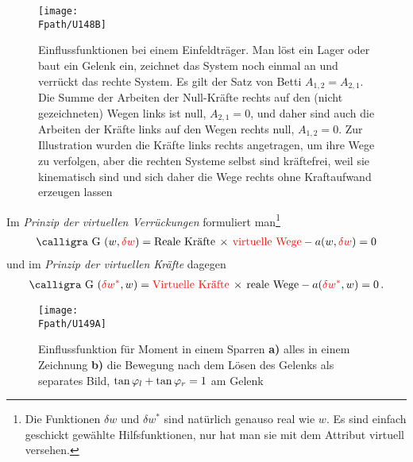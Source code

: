 {{{{%
\begin{figure}[tbp]
\centering
\if {} \sidecaption \fi
\texttt{[image: \\Fpath/U148B]}
\caption{Einflussfunktionen bei einem Einfeldtr\"{a}ger. Man l\"{o}st ein Lager oder baut ein Gelenk ein, zeichnet das System noch einmal an und verr\"{u}ckt das rechte System. Es gilt der Satz von Betti $A_{1,2} = A_{2,1}$. Die Summe der Arbeiten der Null-Kr\"{a}fte rechts auf den (nicht gezeichneten) Wegen links ist null, $A_{2,1} = 0$, und daher sind auch die Arbeiten der Kr\"{a}fte links auf den Wegen rechts null, $A_{1,2} = 0$. Zur Illustration wurden die Kr\"{a}fte links rechts angetragen, um ihre Wege zu verfolgen, aber die rechten Systeme selbst sind kr\"{a}ftefrei, weil sie kinematisch sind und sich daher die Wege rechts ohne Kraftaufwand erzeugen lassen} \label{U148}
\end{figure}%
Im {\em Prinzip der virtuellen Verr\"{u}ckungen\/} formuliert man\footnote{Die Funktionen $\delta w $ und  $\delta w^* $ sind nat\"{u}rlich genauso real wie $w $. Es sind einfach geschickt gew\"{a}hlte Hilfsfunktionen, nur hat man sie mit dem Attribut \glq virtuell\grq{} versehen.}
\begin{align}\label{Eq61}
\text{\normalfont\calligra G\,\,}(w, \textcolor{red}{\delta w}) = \text{Reale Kr\"{a}fte} \,\times\, \textcolor{red}{\text{virtuelle Wege}} - a(w,\textcolor{red}{\delta w}) = 0
\end{align}
und im {\em Prinzip der virtuellen Kr\"{a}fte\/} dagegen
\begin{align}\label{Eq62}
\text{\normalfont\calligra G\,\,}(\textcolor{red}{\delta w^*}, w) = \textcolor{red}{\text{Virtuelle Kr\"{a}fte}} \,\times \,\text{reale Wege} - a(\textcolor{red}{\delta w^*},w) = 0\,.
\end{align}
\begin{figure}[tbp]
\centering
\texttt{[image: \\Fpath/U149A]}
\caption{Einflussfunktion f\"{u}r Moment in einem Sparren {\bf a)} \glq alles in einem\grq{} Zeichnung {\bf b)} die Bewegung nach dem L\"{o}sen des Gelenks als separates Bild, $\tan \varphi_l + \tan \varphi_r = 1$ am Gelenk} \label{U149}
\end{figure}%
}}}}
